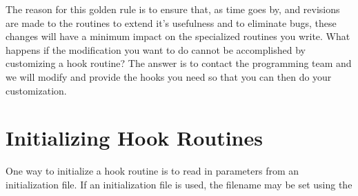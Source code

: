 The reason for this golden rule is to ensure that, as time
goes by, and revisions are made to the \tao routines to extend it's
usefulness and to eliminate bugs, these changes will
have a minimum impact on the specialized routines you write.
What happens if the modification you want to do cannot be accomplished
by customizing a hook routine? The answer is to contact
the \tao programming team and we will modify \tao and provide the hooks 
you need so that you can then do your customization.

\section{Initializing Hook Routines}

One way to initialize a hook routine is to read in parameters from an initialization file.
If an initialization file is used, the filename may be set using the
